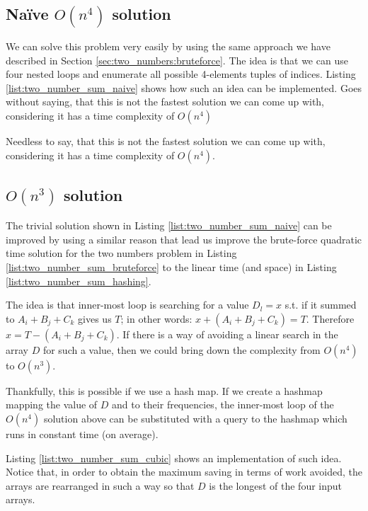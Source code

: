 \subsection{Na\"ive $O(n^4)$ solution}
We can solve this problem very easily by using the same approach we have described in Section \ref{sec:two_numbers:bruteforce}.
The idea is that we can use four nested loops and enumerate all possible 4-elements tuples of indices. Listing \ref{list:two_number_sum_naive} shows how such an idea can be implemented.
Goes without saying, that this is not the fastest solution we can come up with, considering it has a time complexity of $O(n^4)$



Needless to say, that this is not the fastest solution we can come up with, considering it has a time complexity of $O(n^4)$.

\subsection{$O(n^3)$ solution}
The trivial solution shown in Listing \ref{list:two_number_sum_naive} can be improved by using a similar reason that lead us improve the brute-force 
quadratic time solution for the two numbers problem in Listing \ref{list:two_number_sum_bruteforce} to the linear time (and space) in Listing \ref{list:two_number_sum_hashing}.

The idea is that inner-most loop is searching for a value $D_l = x$  s.t. if it summed to $A_i+B_j+C_k$ gives us $T$; in other words: $x+(A_i+B_j+C_k)=T$.
Therefore $x = T-(A_i+B_j+C_k)$. If there is a way of avoiding a linear search in the array $D$ for such a value, then we could bring down the complexity from $O(n^4)$ to $O(n^3)$.

Thankfully, this is possible if we use a hash map. If we create a hashmap mapping the value of $D$ and to their frequencies, the inner-most loop of the $O(n^4)$ solution above can be substituted with a query to the hashmap which runs in constant time (on average). 

Listing \ref{list:two_number_sum_cubic} shows an implementation of such idea. 
Notice that, in order to obtain the maximum saving in terms of work avoided, the arrays are rearranged in such a way so that $D$ is the longest of the four input arrays. 

